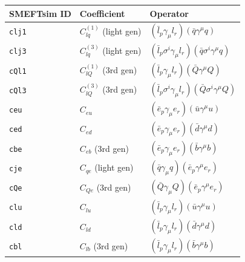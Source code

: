 \documentclass[border=8pt]{standalone}
\begin{document}
\renewcommand{\arraystretch}{1.8}
\begin{tabular}{@{} l l l @{}}
\toprule
\textbf{SMEFTsim ID} & \textbf{Coefficient} & \textbf{Operator} \\
\midrule
\texttt{clj1} & $C_{lq}^{(1)}$ \small{(light gen)} & $(\bar{l}_p\gamma_\mu l_r)(\bar{q}\gamma^\mu q)$ \\
\texttt{clj3} & $C_{lq}^{(3)}$ \small{(light gen)} & $(\bar{l}_p\sigma^i\gamma_\mu l_r)(\bar{q}\sigma^i\gamma^\mu q)$ \\
\texttt{cQl1} & $C_{lQ}^{(1)}$ \small{(3rd gen)} & $(\bar{l}_p\gamma_\mu l_r)(\bar{Q}\gamma^\mu Q)$ \\
\texttt{cQl3} & $C_{lQ}^{(3)}$ \small{(3rd gen)} & $(\bar{l}_p\sigma^i\gamma_\mu l_r)(\bar{Q}\sigma^i\gamma^\mu Q)$ \\
\texttt{ceu}  & $C_{eu}$ & $(\bar{e}_p\gamma_\mu e_r)(\bar{u}\gamma^\mu u)$ \\
\texttt{ced}  & $C_{ed}$ & $(\bar{e}_p\gamma_\mu e_r)(\bar{d}\gamma^\mu d)$ \\
\texttt{cbe}  & $C_{eb}$ \small{(3rd gen)} & $(\bar{e}_p\gamma_\mu e_r)(\bar{b}\gamma^\mu b)$ \\
\texttt{cje}  & $C_{qe}$ \small{(light gen)} & $(\bar{q}\gamma_\mu q)(\bar{e}_p\gamma^\mu e_r)$ \\
\texttt{cQe}  & $C_{Qe}$ \small{(3rd gen)} & $(\bar{Q}\gamma_\mu Q)(\bar{e}_p\gamma^\mu e_r)$ \\
\texttt{clu}  & $C_{lu}$ & $(\bar{l}_p\gamma_\mu l_r)(\bar{u}\gamma^\mu u)$ \\
\texttt{cld}  & $C_{ld}$ & $(\bar{l}_p\gamma_\mu l_r)(\bar{d}\gamma^\mu d)$ \\
\texttt{cbl}  & $C_{lb}$ \small{(3rd gen)} & $(\bar{l}_p\gamma_\mu l_r)(\bar{b}\gamma^\mu b)$ \\
\bottomrule
\end{tabular}
\end{document}
